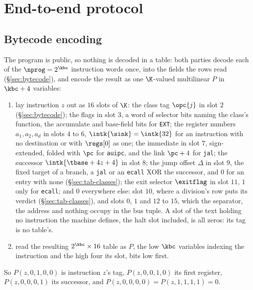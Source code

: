 \section{End-to-end protocol}\label{sec:e2e}

\subsection{Bytecode encoding}\label{sec:e2e-bc}

The program is public, so nothing is decoded in a table: both parties decode each of the $\nprog=2^{\kbc}$ instruction words once, into the fields the rows read (\S\ref{sec:bytecode}), and encode the result as one $\K$-valued multilinear $P$ in $\kbc+4$ variables:
\begin{enumerate}[itemsep=1pt,topsep=3pt]
\item lay instruction $z$ out as $16$ slots of $\K$: the class tag $\opc{j}$ in slot $2$ (\S\ref{sec:bytecode}); the flags in slot $3$, a word of selector bits naming the class's function, the accumulate and base-field bits for \texttt{EXT}; the register numbers $a_1,a_2,a_d$ in slots $4$ to $6$, $\intk{\sink}=\intk{32}$ for an instruction with no destination or with $\regs[0]$ as one; the immediate in slot $7$, sign-extended, folded with $\pc$ for \texttt{auipc}, and the link $\pc+4$ for \texttt{jal}; the successor $\intk{\tbase+4z+4}$ in slot $8$; the jump offset $\Delta$ in slot $9$, the fixed target of a branch, a \texttt{jal} or an \texttt{ecall} XOR the successor, and $0$ for an entry with none (\S\ref{sec:tab-classes}); the exit selector $\exitflag$ in slot $11$, $1$ only for \texttt{ecall}; and $0$ everywhere else: slot $10$, where a division's row puts its verdict (\S\ref{sec:tab-classes}), and slots $0$, $1$ and $12$ to $15$, which the separator, the address and nothing occupy in the bus tuple. A slot of the text holding no instruction the machine defines, the halt slot included, is all zeros: its tag is no table's.
\item read the resulting $2^{\kbc}\times16$ table as $P$, the low $\kbc$ variables indexing the instruction and the high four its slot, bits low first.
\end{enumerate}
So $P(z,0,1,0,0)$ is instruction $z$'s tag, $P(z,0,0,1,0)$ its first register, $P(z,0,0,0,1)$ its successor, and $P(z,0,0,0,0)=P(z,1,1,1,1)=0$.

